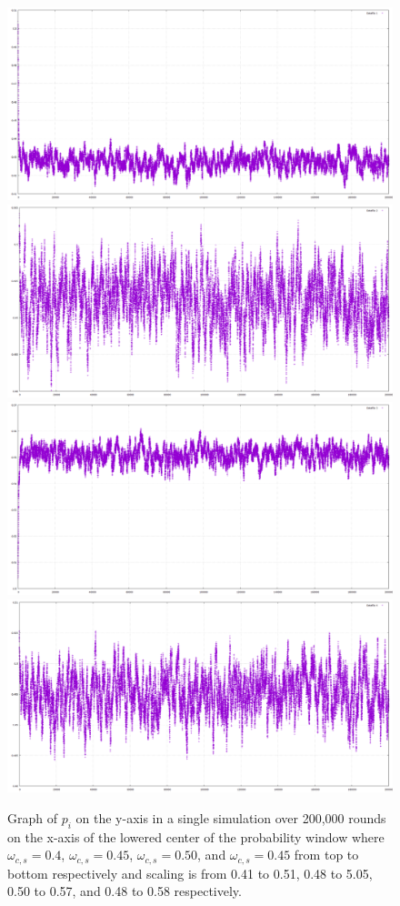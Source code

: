 \documentclass{article}
\begin{document}
\begin{figure}[htp]
\centering
\includegraphics[width=.7\textwidth]{images/ai99lowprobside1}\hfill
\includegraphics[width=.7\textwidth]{images/ai99lowprobside2}\hfill
\includegraphics[width=.7\textwidth]{images/ai99lowprobside3}\hfill
\includegraphics[width=.7\textwidth]{images/ai99lowprobside4}
\caption{Graph of $p_i$ on the y-axis in a single simulation over 200,000 rounds on the x-axis of the lowered center of the probability window where $\omega_{c,s} = 0.4$, $\omega_{c,s} = 0.45$, $\omega_{c,s} = 0.50$, and $\omega_{c,s} = 0.45$ from top to bottom respectively and scaling is from 0.41 to 0.51, 0.48 to 5.05, 0.50 to 0.57, and 0.48 to 0.58 respectively.}
\label{fig:figure3}
\end{figure}
\end{document}
